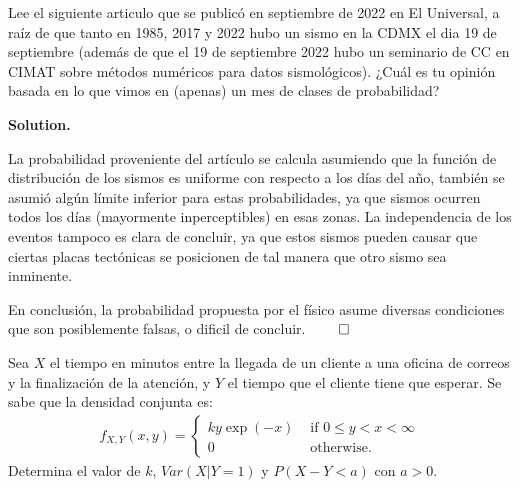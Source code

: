 \documentclass{article}
\theoremstyle{problemstyle}
\newenvironment{solution}{%
  \begin{mdframed}[linewidth=0.8pt,linecolor=Gray,backgroundcolor=Gray!5,roundcorner=5pt]%
  \noindent\textbf{Solution.}%
}{%
\hfill $ \qed $ 
  \end{mdframed}%
}
\begin{document}
\begin{problem}
Lee el siguiente articulo que se public\'o en septiembre de 2022 en El
Universal, a ra\'iz de que tanto en 1985, 2017 y 2022 hubo un sismo en la CDMX
el dia 19 de septiembre (adem\'as de que el 19 de septiembre 2022 hubo un
seminario de CC en CIMAT sobre m\'etodos num\'ericos para datos
sismol\'ogicos).
¿Cu\'al es tu opini\'on basada en lo que vimos en (apenas) un mes de clases de
probabilidad?
\end{problem}

\begin{solution}
	La probabilidad proveniente del art\'iculo se calcula asumiendo que la
	funci\'on de distribuci\'on de los sismos es uniforme con respecto a los
	d\'ias del a\~no, tambi\'en se asumi\'o alg\'un l\'imite inferior para estas
	probabilidades, ya que sismos ocurren todos los d\'ias (mayormente
	inperceptibles) en esas zonas. La independencia de los eventos tampoco es
	clara de concluir, ya que estos sismos pueden causar que ciertas placas
	tect\'onicas se posicionen de tal manera que otro sismo sea inminente.

	En conclusi\'on, la probabilidad propuesta por el f\'isico asume diversas
	condiciones que son posiblemente falsas, o dificil de concluir.
\end{solution}

\begin{problem}
Sea $ X $ el tiempo en minutos entre la llegada de un cliente a una oficina de
correos y la finalizaci\'on de la atenci\'on, y $ Y $ el tiempo que el cliente
tiene que esperar. Se sabe que la densidad conjunta es:
\begin{align*}
	f_{X,Y}(x,y) =
	\begin{cases}
		ky\exp(-x) & \text{ if } 0\leq y<x<\infty \\
		0          & \text{ otherwise}.
	\end{cases}
\end{align*}
Determina el valor de $ k $, $ Var(X|Y=1) $ y $ P(X-Y<a) $ con $ a>0 $.
\end{problem}
\end{document}
